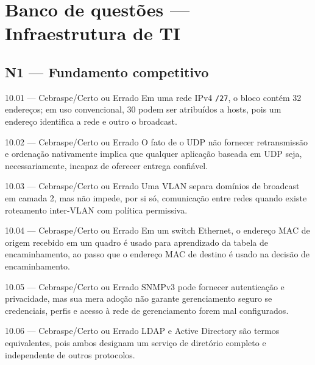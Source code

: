 \section{Banco de questões — Infraestrutura de TI}

\subsection*{N1 — Fundamento competitivo}

\begin{questao}{ 10.01 — Cebraspe/Certo ou Errado}
Em uma rede IPv4 \texttt{/27}, o bloco contém 32 endereços; em uso convencional, 30 podem ser atribuídos a hosts, pois um endereço identifica a rede e outro o broadcast.
\end{questao}

\begin{questao}{ 10.02 — Cebraspe/Certo ou Errado}
O fato de o UDP não fornecer retransmissão e ordenação nativamente implica que qualquer aplicação baseada em UDP seja, necessariamente, incapaz de oferecer entrega confiável.
\end{questao}

\begin{questao}{ 10.03 — Cebraspe/Certo ou Errado}
Uma VLAN separa domínios de broadcast em camada 2, mas não impede, por si só, comunicação entre redes quando existe roteamento inter-VLAN com política permissiva.
\end{questao}

\begin{questao}{ 10.04 — Cebraspe/Certo ou Errado}
Em um switch Ethernet, o endereço MAC de origem recebido em um quadro é usado para aprendizado da tabela de encaminhamento, ao passo que o endereço MAC de destino é usado na decisão de encaminhamento.
\end{questao}

\begin{questao}{ 10.05 — Cebraspe/Certo ou Errado}
SNMPv3 pode fornecer autenticação e privacidade, mas sua mera adoção não garante gerenciamento seguro se credenciais, perfis e acesso à rede de gerenciamento forem mal configurados.
\end{questao}

\begin{questao}{ 10.06 — Cebraspe/Certo ou Errado}
LDAP e Active Directory são termos equivalentes, pois ambos designam um serviço de diretório completo e independente de outros protocolos.
\end{questao}

